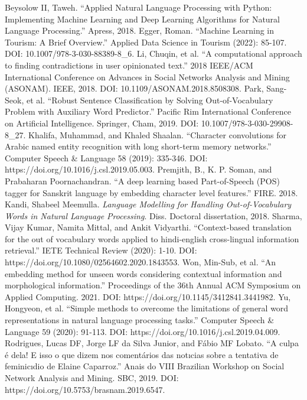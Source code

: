 \documentclass[conference]{IEEEtran}
\begin{document}
\begin{thebibliography}{00}
 Beysolow II, Taweh. ``Applied Natural Language Processing with Python: Implementing Machine Learning and Deep Learning Algorithms for Natural Language Processing.'' Apress, 2018.
 Egger, Roman. ``Machine Learning in Tourism: A Brief Overview.'' Applied Data Science in Tourism (2022): 85-107. DOI: 10.1007/978-3-030-88389-8\_6.
 Li, Chuqin, et al. ``A computational approach to finding contradictions in user opinionated text.'' 2018 IEEE/ACM International Conference on Advances in Social Networks Analysis and Mining (ASONAM). IEEE, 2018. DOI: 10.1109/ASONAM.2018.8508308.
 Park, Sang-Seok, et al. ``Robust Sentence Classification by Solving Out-of-Vocabulary Problem with Auxiliary Word Predictor.'' Pacific Rim International Conference on Artificial Intelligence. Springer, Cham, 2019. DOI: 10.1007/978-3-030-29908-8\_27.
 Khalifa, Muhammad, and Khaled Shaalan. ``Character convolutions for Arabic named entity recognition with long short-term memory networks.'' Computer Speech \& Language 58 (2019): 335-346. DOI: https://doi.org/10.1016/j.csl.2019.05.003.
 Premjith, B., K. P. Soman, and Prabaharan Poornachandran. ``A deep learning based Part-of-Speech (POS) tagger for Sanskrit language by embedding character level features.'' FIRE. 2018.
 Kandi, Shabeel Meemulla. \textit{Language Modelling for Handling Out-of-Vocabulary Words in Natural Language Processing}. Diss. Doctoral dissertation, 2018.
 Sharma, Vijay Kumar, Namita Mittal, and Ankit Vidyarthi. ``Context-based translation for the out of vocabulary words applied to hindi-english cross-lingual information retrieval.'' IETE Technical Review (2020): 1-10. DOI: https://doi.org/10.1080/02564602.2020.1843553.
 Won, Min-Sub, et al. ``An embedding method for unseen words considering contextual information and morphological information.'' Proceedings of the 36th Annual ACM Symposium on Applied Computing. 2021. DOI: https://doi.org/10.1145/3412841.3441982.
 Yu, Hongyeon, et al. ``Simple methods to overcome the limitations of general word representations in natural language processing tasks.'' Computer Speech \& Language 59 (2020): 91-113. DOI: https://doi.org/10.1016/j.csl.2019.04.009.
 Rodrigues, Lucas DF, Jorge LF da Silva Junior, and Fábio MF Lobato. ``A culpa é dela! E isso o que dizem nos comentários das notıcias sobre a tentativa de feminicıdio de Elaine Caparroz.'' Anais do VIII Brazilian Workshop on Social Network Analysis and Mining. SBC, 2019. DOI: https://doi.org/10.5753/brasnam.2019.6547.

\end{thebibliography}
\end{document}
